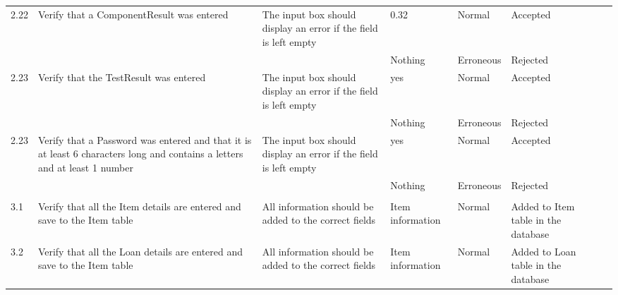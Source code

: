 \begin{landscape}
\begin{center}
\begin{longtable}{|p{1.5cm}|p{2cm}|p{3cm}|p{2cm}|p{2cm}|p{2.5cm}|p{2cm}|p{2cm}|}
        2.22 & Verify that a ComponentResult was entered & The input box should display an error if the field is left empty & 0.32 & Normal & Accepted & & \\   
             &                                      &                                                               & Nothing      & Erroneous & Rejected & & \\ \hline
             
        2.23 & Verify that the TestResult was entered & The input box should display an error if the field is left empty & yes & Normal & Accepted & & \\   
             &                                      &                                                               & Nothing      & Erroneous & Rejected & & \\ \hline
             
        2.23 & Verify that a Password was entered and that it is at least 6 characters long and contains a letters and at least 1 number & The input box should display 
                                                                                                                                           an error if the field is 
                                                                                                                                           left empty & yes & Normal & 
                                                                                                                                           Accepted & & \\   
             &                                      &                                                               & Nothing      & Erroneous & Rejected & & \\ \hline
        
        & & & & & & & \\ \hline

        3.1 & Verify that all the Item details are entered and save to the Item table & All information should be added to the correct fields & Item information & 
              Normal & Added to Item table in the database & & \\ \hline
        
        3.2 & Verify that all the Loan details are entered and save to the Item table & All information should be added to the correct fields & Item information & 
              Normal & Added to Loan table in the database & & \\ \hline
        

\end{longtable}
\end{center}
\end{landscape}
